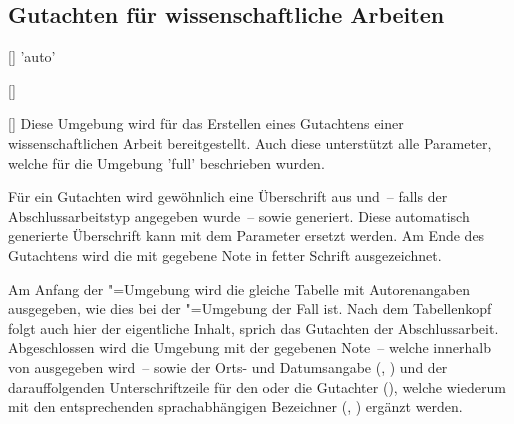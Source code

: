 \subsection{Gutachten für wissenschaftliche Arbeiten}
\begin{Declaration}{[]}{%
  'auto'%
}
\begin{Declaration}{%
  []%
}
\begin{Declaration}{[]}
\printdeclarationlist%
%
%
Diese Umgebung wird für das Erstellen eines Gutachtens einer wissenschaftlichen 
Arbeit bereitgestellt. Auch diese unterstützt alle Parameter, welche für die 
Umgebung 'full' beschrieben wurden.

Für ein Gutachten wird gewöhnlich eine Überschrift aus  
und~-- falls der Abschlussarbeitstyp angegeben wurde~--  
sowie  generiert. Diese automatisch generierte Überschrift kann 
mit dem Parameter  ersetzt werden. Am 
Ende des Gutachtens wird die mit  
gegebene Note in fetter Schrift ausgezeichnet.

Am Anfang der "=Umgebung wird die gleiche Tabelle mit 
Autorenangaben ausgegeben, wie dies bei der "=Umgebung der 
Fall ist. Nach dem Tabellenkopf folgt auch hier der eigentliche Inhalt, sprich 
das Gutachten der Abschlussarbeit. Abgeschlossen wird die Umgebung mit der 
gegebenen Note~-- welche innerhalb von  ausgegeben wird~-- 
sowie der Orts- und Datumsangabe (, ) und der 
darauffolgenden Unterschriftzeile für den oder die Gutachter (), 
welche wiederum mit den entsprechenden sprachabhängigen Bezeichner 
(, ) ergänzt werden.
\end{Declaration}
\end{Declaration}
\end{Declaration}

